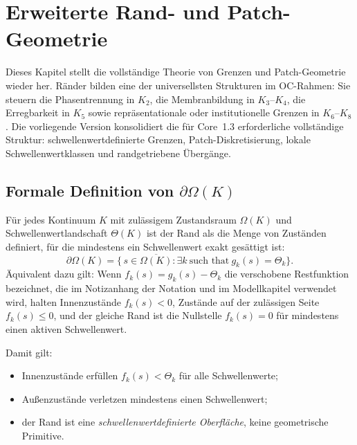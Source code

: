 
\section{Erweiterte Rand- und Patch-Geometrie}
\label{sec:boundary-extended}

Dieses Kapitel stellt die vollständige Theorie von Grenzen und Patch-Geometrie wieder her.
Ränder bilden eine der universellsten Strukturen im OC-Rahmen:
Sie steuern die Phasentrennung in \(K_2\), die Membranbildung in \(K_3\)--\(K_4\),
die Erregbarkeit in \(K_5\) sowie repräsentationale oder institutionelle Grenzen in
\(K_6\)--\(K_8\).
Die vorliegende Version konsolidiert die für Core~1.3 erforderliche vollständige Struktur:
schwellenwertdefinierte Grenzen, Patch-Diskretisierung, lokale Schwellenwertklassen
und randgetriebene Übergänge.

\subsection{Formale Definition von \texorpdfstring{$\partial\Omega(K)$}{boundary}}

Für jedes Kontinuum \(K\) mit zulässigem Zustandsraum \(\Omega(K)\) und Schwellenwertlandschaft
\(\Theta(K)\) ist der Rand als die Menge von Zuständen definiert, für die
mindestens ein Schwellenwert exakt gesättigt ist:
\[
  \partial\Omega(K)
  =
  \big\{\, s \in \overline{\Omega(K)} :
          \exists k\ \text{such that}\ g_k(s) = \Theta_k \big\}.
\]
Äquivalent dazu gilt: Wenn \(f_k(s)=g_k(s)-\Theta_k\) die verschobene Restfunktion
bezeichnet, die im Notizanhang der Notation und im Modellkapitel verwendet wird,
halten Innenzustände \(f_k(s)<0\), Zustände auf der zulässigen Seite \(f_k(s)\le0\), und
der gleiche Rand ist die Nullstelle \(f_k(s)=0\) für mindestens einen aktiven Schwellenwert.

Damit gilt:
\begin{itemize}
    \item Innenzustände erfüllen \(f_k(s) < \Theta_k\) für alle Schwellenwerte;
    \item Außenzustände verletzen mindestens einen Schwellenwert;
    \item der Rand ist eine \emph{schwellenwertdefinierte Oberfläche}, keine geometrische
          Primitive.
\end{itemize}

